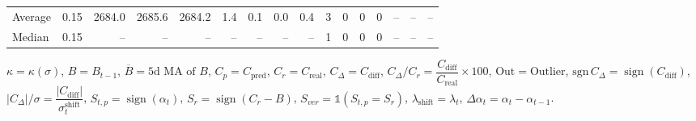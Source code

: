 \begin{threeparttable}
{\begin{tabular}{lrrrrrrrrrrrrrrr}
Average &     0.15 & 2684.0 & 2685.6 & 2684.2 &        1.4 &            0.1 &                      0.0 &                 0.4 &              3 &         0 &     0 &         0 &         -- &        -- &             -- \\
 Median &     0.15 &     -- &     -- &     -- &         -- &             -- &                       -- &                  -- &              1 &         0 &     0 &         0 &         -- &        -- &             -- \\
\bottomrule
\end{tabular}
}
\begin{tablenotes}\footnotesize
\item $\kappa=\kappa(\sigma)$, $B=B_{t-1}$, $\overline{B}=\text{5d MA of }B$, $C_p=C_{\text{pred}}$, $C_r=C_{\text{real}}$, $C_\Delta=C_{\text{diff}}$, $C_\Delta/C_r=\dfrac{C_{\text{diff}}}{C_{\text{real}}}\times100$, $\mathrm{Out}=\text{Outlier}$, $\mathrm{sgn}\,C_\Delta=\operatorname{sign}(C_{\text{diff}})$, $|C_\Delta|/\sigma=\dfrac{|C_{\text{diff}}|}{\sigma_t^{\text{shift}}}$, $S_{t,p}=\operatorname{sign}(\alpha_t)$, $S_r=\operatorname{sign}(C_r - B)$, $S_{ver}=\mathbb{1}(S_{t,p}=S_r)$, $\lambda_{\text{shift}}=\lambda_t$, $\Delta\alpha_t=\alpha_t-\alpha_{t-1}$.\end{tablenotes}
\end{threeparttable}
\endgroup


